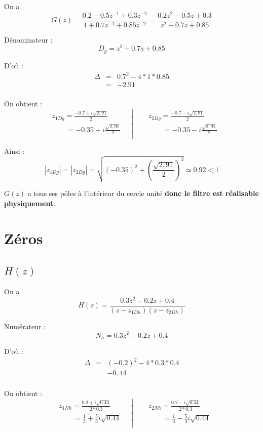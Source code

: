 \documentclass[12,french]{report}
\begin{document}
\vspace{0.25cm}

On a $$ G(z) = \frac{0.2-0.5z^{-1}+0.3z^{-2}}{1+0.7z^{-1}+0.85z^{-2}} = \frac{0.2z^2-0.5z+0.3}{z^2+0.7z+0.85} $$

Dénominateur : $$ D_g= z^2+0.7z+0.85 $$

D'où : $$ \begin{array}{ccl}
\Delta & = & 0.7^2-4*1*0.85 \\
	   & = & -2.91 \\
\end{array} $$

On obtient :
$$\left.\begin{aligned}
	&z_{1Dg} = \frac{-0.7+i\sqrt{2,91}}{2} \\
	&\quad\quad = -0.35 + i\frac{\sqrt{2,91}}{2} \\
\end{aligned}\quad\right|
\quad\left.\begin{aligned}
	&z_{2Dg} = \frac{-0.7-i\sqrt{2,91}}{2}\\
	&\quad\quad =-0.35 - i\frac{\sqrt{2,91}}{2} \\
\end{aligned}\right.$$

Ainsi :
$$ |z_{1Dg}|=|z_{2Dg}|=\sqrt{(-0.35)^2+\left(\frac{\sqrt{2,91}}{2}\right)^2} \simeq 0.92 < 1 $$


$G(z)$ a tous ses pôles à l'intérieur du cercle unité \textbf{donc le filtre est réalisable physiquement}.

\section{Zéros}

\subsection{$H(z)$}

\vspace{0.25cm}

On a $$ H(z) = \frac{0.3z^2-0.2z+0.4}{(z-z_{1Dh})(z-z_{2Dh})} $$

Numérateur : $$ N_h= 0.3z^2-0.2z+0.4 $$

D'où : $$ \begin{array}{ccl}
\Delta & = & (-0.2)^2-4*0.3*0.4 \\
	   & = & -0,44 \\
\end{array} $$

On obtient :
$$\left.\begin{aligned}
	&z_{1Nh} = \frac{0.2+i\sqrt{0.44}}{2*0.3} \\
	&\quad\quad = \frac{1}{3} + \frac{5}{3}i\sqrt{0.44} \\
\end{aligned}\quad\right|
\quad\left.\begin{aligned}
	&z_{2Nh} = \frac{0.2-i\sqrt{0.44}}{2*0.3}\\
	&\quad\quad = \frac{1}{3} - \frac{5}{3}i\sqrt{0.44} \\
\end{aligned}\right.$$
\end{document}
